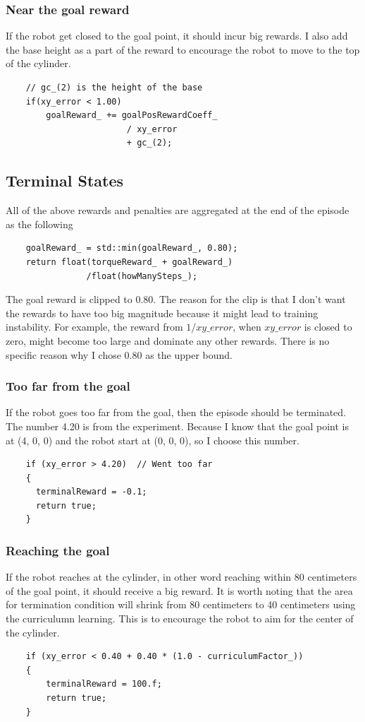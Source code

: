 \documentclass{article}
\begin{document}
    \subsubsection{Near the goal reward}
        If the robot get closed to the goal point, it should incur big rewards. 
        I also add the base height as a part of the reward to encourage the robot to move to the top of the cylinder.
    \begin{verbatim}
    // gc_(2) is the height of the base
    if(xy_error < 1.00)
        goalReward_ += goalPosRewardCoeff_ 
                        / xy_error 
                        + gc_(2);
    \end{verbatim}

    \subsection{Terminal States}
    All of the above rewards and penalties are aggregated at the end of the episode as the following 
    \begin{verbatim}
    goalReward_ = std::min(goalReward_, 0.80);
    return float(torqueReward_ + goalReward_)
                /float(howManySteps_);
    \end{verbatim}
    The goal reward is clipped to 0.80. The reason for the clip is that I don't want the rewards to have too big magnitude 
    because it might lead to training instability. For example, the reward from $1/xy\_error$, when $xy\_error$ is closed to zero, 
    might become too large and dominate any other rewards. There is no specific reason why I chose 0.80 as the upper bound.


    \subsubsection{Too far from the goal}
    If the robot goes too far from the goal, then the episode should be terminated. The number 4.20 is from the experiment.
    Because I know that the goal point is at (4, 0, 0) and the robot start at (0, 0, 0), so I choose this number.
    \begin{verbatim}
    if (xy_error > 4.20)  // Went too far
    {
      terminalReward = -0.1;
      return true;
    }
    \end{verbatim}
    
    \subsubsection{Reaching the goal}
    If the robot reaches at the cylinder, in other word reaching within 80 centimeters of the goal point, it should receive a big reward.
    It is worth noting that the area for termination condition will shrink from 80 centimeters to 40 centimeters using the curriculumn learning.
    This is to encourage the robot to aim for the center of the cylinder.
    \pagebreak
    \begin{verbatim}
    if (xy_error < 0.40 + 0.40 * (1.0 - curriculumFactor_))
    {
        terminalReward = 100.f;
        return true;
    }
    \end{verbatim}
\end{document}
